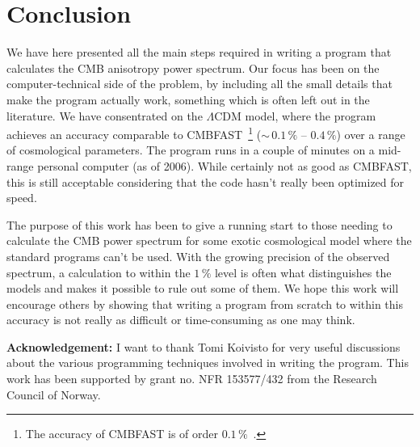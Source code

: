\documentclass[twocolumn,nofootinbib,amsmath,amssymb]{revtex4}
\newcommand{\lcdm}{\Lambda\mathrm{CDM}}
\begin{document}
\section{Conclusion}
\label{cha:conclusion}

We have here presented all the main steps required in writing a program that
calculates the CMB anisotropy power spectrum. Our focus has been on the
computer-technical side of the problem, by including all the small details that
make the program actually work, something which is often left out in the
literature. We have consentrated on the $\lcdm$ model, where the program
achieves an accuracy comparable to CMBFAST~\footnote{The accuracy of CMBFAST is
of order $0.1 \,\%$~\cite{CMBFAST_accuracy}.} ($\sim \, 0.1 \,\%$ -- $0.4
\,\%$) over a range of cosmological parameters. The program runs in a couple of
minutes on a mid-range personal computer (as of 2006). While certainly not as
good as CMBFAST, this is still acceptable considering that the code hasn't
really been optimized for speed.

The purpose of this work has been to give a running start to those needing to
calculate the CMB power spectrum for some exotic cosmological model where the
standard programs can't be used. With the growing precision of the observed
spectrum, a calculation to within the $1 \,\%$ level is often what
distinguishes the models and makes it possible to rule out some of them. We
hope this work will encourage others by showing that writing a program from
scratch to within this accuracy is not really as difficult or time-consuming as
one may think.


\textbf{Acknowledgement:} I want to thank Tomi Koivisto for very useful
discussions about the various programming techniques involved in writing the
program. This work has been supported by grant no. NFR 153577/432 from the
Research Council of Norway.
\end{document}
